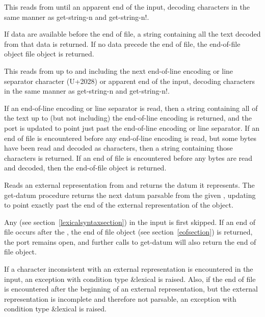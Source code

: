 \begin{entry}{%
}
   
This reads from  until an apparent end of the input, decoding
characters in the same manner as {\cf get-string-n} and {\cf get-string-n!}.
   
If data are available before the end of file, a string
containing all the text decoded from that data is returned. If no data
precede the end of file, the end-of-file object file object is
returned.
\end{entry}

\begin{entry}{%
}
   
This reads from  up to and including the next
end-of-line encoding or line separator character (U+2028) or apparent
end of the input, decoding characters in the same manner as {\cf
  get-string-n} and {\cf get-string-n!}.
   
If an end-of-line encoding or line separator is read, then a string
containing all of the text up to (but not including) the end-of-line
encoding is returned, and the port is updated to point just past the
end-of-line encoding or line separator. If an end of file is
encountered before any end-of-line encoding is read, but some bytes
have been read and decoded as characters, then a string containing
those characters is returned. If an end of file is encountered before
any bytes are read and decoded, then the end-of-file object is
returned.
\end{entry}

\begin{entry}{%
}
 
Reads an external representation from  and returns the
datum it represents.  The {\cf get-datum} procedure returns the next
datum parsable from the given , updating
 to point exactly past the end of the external
representation of the object.

Any  (see section~\ref{lexicalsyntaxsection}) in
the input is first skipped.  If an end of file occurs after the
, the end of file object (see
section~\ref{eofsection}) is returned, the port remains open, and
further calls to {\cf get-datum} will also return the end of file
object.

If a character inconsistent with an external representation is
encountered in the input, an exception with condition type
{\cf\&lexical} is raised.  Also, if the end of file is encountered
after the beginning of an external representation, but the external
representation is incomplete and therefore not parsable, an exception
with condition type {\cf\&lexical} is raised.
\end{entry}

